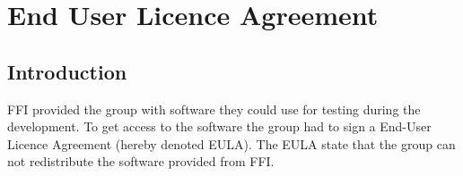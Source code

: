 \chapter{End User Licence Agreement}
\label{appendix-eula}

\section{Introduction}

FFI provided the group with software they could use for testing during the development. To get access to the software the group had to sign a End-User Licence Agreement (hereby denoted EULA). The EULA state that the group can not redistribute the software provided from FFI.


